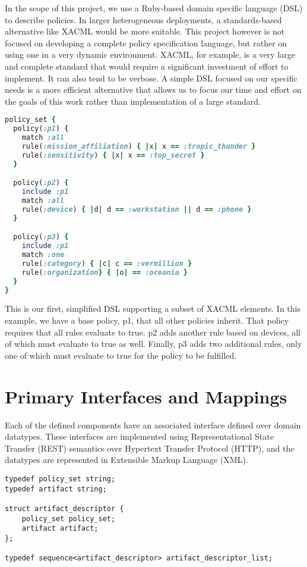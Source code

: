 In the scope of this project, we use a Ruby-based domain specific language (DSL) to describe policies.  In larger heterogeneous deployments, a standards-based alternative like XACML would be more suitable.  This project however is not focused on developing a complete policy specification language, but rather on using one in a very dynamic environment.  XACML, for example, is a very large and complete standard that would require a significant investment of effort to implement.  It can also tend to be verbose.  A simple DSL focused on our specific needs is a more efficient alternative that allows us to focus our time and effort on the goals of this work rather than implementation of a large standard.

\begin{lstlisting}[language=ruby, label=lst:policy-dsl, caption=Policy DSL Example]
policy_set {
  policy(:p1) {
    match :all
    rule(:mission_affiliation) { |x| x == :tropic_thunder }
    rule(:sensitivity) { |x| x == :top_secret }
  }

  policy(:p2) {
    include :p1
    match :all
    rule(:device) { |d| d == :workstation || d == :phone }
  }

  policy(:p3) {
    include :p1
    match :one
    rule(:category) { |c| c == :vermillion }
    rule(:organization} { |o| == :oceania }
  }
}
\end{lstlisting}

This is our first, simplified DSL supporting a subset of XACML elements.  In this example, we have a base policy, p1, that all other policies inherit.  That policy requires that all rules evaluate to true.  p2 adds another rule based on devices, all of which must evaluate to true as well.  Finally, p3 adds two additional rules, only one of which must evaluate to true for the policy to be fulfilled.

\section{Primary Interfaces and Mappings}
Each of the defined components have an associated interface defined over domain datatypes. These interfaces are implemented using Representational State Transfer (REST) semantics over Hypertext Transfer Protocol (HTTP), and the datatypes are represented in Extensible Markup Language (XML).

\begin{lstlisting}[language=idl, label=lst:artifact-data-types, caption=Key Artifact Dataypes]
typedef policy_set string;
typedef artifact string;

struct artifact_descriptor {
	policy_set policy_set;
	artifact artifact;
};

typedef sequence<artifact_descriptor> artifact_descriptor_list;
\end{lstlisting}

